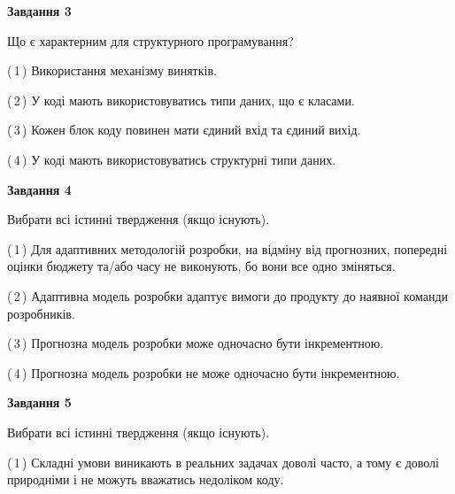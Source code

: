 \documentclass[10pt, ukrainian]{article}
\begin{document}
{\begin {large}
{\begin {center}\textbf{Завдання 3}\end {center}}\par
Що є характерним для структурного програмування?\par
\vspace{2mm}



(\,1\,) Використання механізму винятків. %



(\,2\,) У коді мають використовуватись типи даних, що є класами. %



(\,3\,) Кожен блок коду повинен мати єдиний вхід та єдиний вихід.%



(\,4\,) У коді мають використовуватись структурні типи даних. %


{\begin {center}\textbf{Завдання 4}\end {center}}\par
Вибрати всі істинні твердження (якщо існують).\par
\vspace{2mm}



(\,1\,) Для адаптивних методологій розробки, на відміну від прогнозних, попередні оцінки бюджету та/або часу не виконують, бо вони все одно зміняться. %



(\,2\,) Адаптивна модель розробки адаптує вимоги до продукту до наявної команди розробників. %



(\,3\,) Прогнозна модель розробки може одночасно бути інкрементною. %



(\,4\,) Прогнозна модель розробки не може одночасно бути інкрементною. %


{\begin {center}\textbf{Завдання 5}\end {center}}\par
Вибрати всі істинні твердження (якщо існують).\par
\vspace{2mm}



(\,1\,) Складні умови виникають в реальних задачах доволі часто, а тому є доволі природніми і не можуть вважатись недоліком коду. %




\end{large}}
\end{document}
